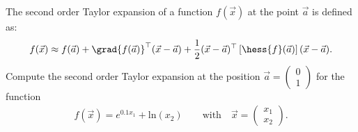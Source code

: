

\begin{exercise}[subtitle={Paper}]
The second order Taylor expansion of a function $f(\vec{x})$ at the point $\vec{a}$ is defined as:
%
\begin{equation*}
f(\vec x) \approx f(\vec a) + \grad{f(\vec a)}^\top(\vec x - \vec a) + \frac{1}{2}(\vec x - \vec a)^\top \left[\hess{f}(\vec a)\right](\vec x - \vec a).
\end{equation*}
Compute the second order Taylor expansion at the position $\vec a = \begin{pmatrix}
0\\ 1
\end{pmatrix}$ for the function
\begin{eqnarray*}
f(\vec x) = e^{0.1x_1} + \mathrm{ln}(x_2) \qquad \text{with}\quad \vec x = \begin{pmatrix}
x_1\\ x_2
\end{pmatrix}.
\end{eqnarray*}

\end{exercise}

